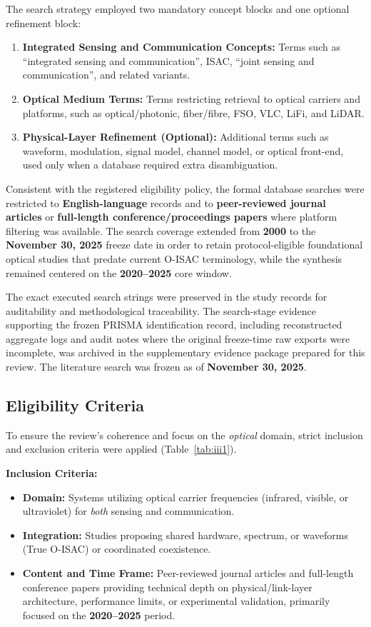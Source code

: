 \documentclass[letterpaper,journal]{IEEEtran}
\begin{document}
The search strategy employed two mandatory concept blocks and one optional refinement block:
\begin{enumerate}
    \item \textbf{Integrated Sensing and Communication Concepts:} Terms such as ``integrated sensing and communication'', ISAC, ``joint sensing and communication'', and related variants.
    \item \textbf{Optical Medium Terms:} Terms restricting retrieval to optical carriers and platforms, such as optical/photonic, fiber/fibre, FSO, VLC, LiFi, and LiDAR.
    \item \textbf{Physical-Layer Refinement (Optional):} Additional terms such as waveform, modulation, signal model, channel model, or optical front-end, used only when a database required extra disambiguation.
\end{enumerate}

Consistent with the registered eligibility policy, the formal database searches were restricted to \textbf{English-language} records and to \textbf{peer-reviewed journal articles} or \textbf{full-length conference/proceedings papers} where platform filtering was available. The search coverage extended from \textbf{2000} to the \textbf{November 30, 2025} freeze date in order to retain protocol-eligible foundational optical studies that predate current O-ISAC terminology, while the synthesis remained centered on the \textbf{2020--2025} core window.

The exact executed search strings were preserved in the study records for auditability and methodological traceability. The search-stage evidence supporting the frozen PRISMA identification record, including reconstructed aggregate logs and audit notes where the original freeze-time raw exports were incomplete, was archived in the supplementary evidence package prepared for this review. The literature search was frozen as of \textbf{November 30, 2025}.

\subsection{Eligibility Criteria}
To ensure the review's coherence and focus on the \textit{optical} domain, strict inclusion and exclusion criteria were applied (Table~\ref{tab:iii1}).

\textbf{Inclusion Criteria:}
\begin{itemize}
    \item \textbf{Domain:} Systems utilizing optical carrier frequencies (infrared, visible, or ultraviolet) for \textit{both} sensing and communication.
    \item \textbf{Integration:} Studies proposing shared hardware, spectrum, or waveforms (True O-ISAC) or coordinated coexistence.
    \item \textbf{Content and Time Frame:} Peer-reviewed journal articles and full-length conference papers providing technical depth on physical/link-layer architecture, performance limits, or experimental validation, primarily focused on the \textbf{2020--2025} period.
\end{itemize}
\end{document}
